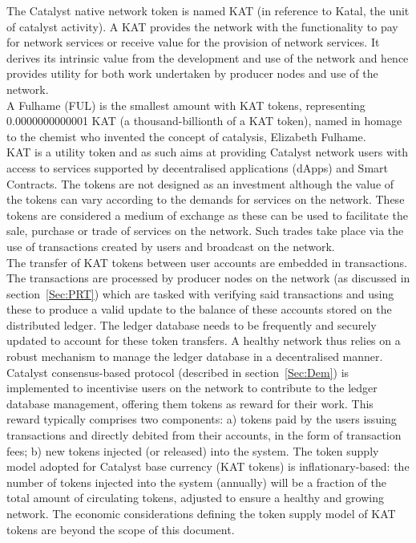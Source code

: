 The Catalyst native network token is named KAT (in reference to Katal, the unit of catalyst activity). A KAT provides the network with the functionality to pay for network services or receive value for the provision of network services. It derives its intrinsic value from the development and use of the network and hence provides utility for both work undertaken by producer nodes and use of the network. \\

A Fulhame (FUL) is the smallest amount with KAT tokens, representing 0.0000000000001 KAT (a thousand-billionth of a KAT token), named in homage to the chemist who invented the concept of catalysis, Elizabeth Fulhame.\\

KAT is a utility token and as such aims at providing Catalyst network users with access to services supported by decentralised applications (dApps) and Smart Contracts. The tokens are not designed as an investment although the value of the tokens can vary according to the demands for services on the network. These tokens are considered a medium of exchange as these can be used to facilitate the sale, purchase or trade of services on the network. Such trades take place via the use of transactions created by users and broadcast on the network. \\

The transfer of KAT tokens between user accounts are embedded in transactions. The transactions are processed by producer nodes on the network (as discussed in section~\ref{Sec:PRT}) which are tasked with verifying said transactions and using these to produce a valid update to the balance of these accounts stored on the distributed ledger. The ledger database needs to be frequently and securely updated to account for these token transfers. A healthy network thus relies on a robust mechanism to manage the ledger database in a decentralised manner. Catalyst consensus-based protocol (described in section~\ref{Sec:Dem}) is implemented to incentivise users on the network to contribute to the ledger database management, offering them tokens as reward for their work. This reward typically comprises two components: a) tokens paid by the users issuing transactions and directly debited from their accounts, in the form of transaction fees; b) new tokens injected (or released) into the system. The token supply model adopted for Catalyst base currency (KAT tokens) is inflationary-based: the number of tokens injected into the system (annually) will be a fraction of the total amount of circulating tokens, adjusted to ensure a healthy and growing network. The economic considerations defining the token supply model of KAT tokens are beyond the scope of this document. 
